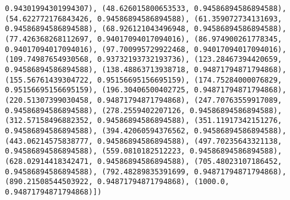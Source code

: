 \documentclass[11pt]{article}
\begin{document}
\begin{Verbatim}[commandchars=\\\{\}]
0.94301994301994307), (48.626015800653533, 0.94586894586894588), (54.622772176843426, 0.94586894586894588), (61.359072734131693, 0.94586894586894588), (68.926121043496948, 0.94586894586894588), (77.426368268112697, 0.94017094017094016), (86.974900261778345, 0.94017094017094016), (97.700995729922468, 0.94017094017094016), (109.74987654930568, 0.93732193732193736), (123.28467394420659, 0.94586894586894588), (138.48863713938718, 0.94871794871794868), (155.56761439304722, 0.95156695156695159), (174.75284000076829, 0.95156695156695159), (196.30406500402725, 0.94871794871794868), (220.51307399030458, 0.94871794871794868), (247.70763559917089, 0.94586894586894588), (278.2559402207126, 0.94586894586894588), (312.57158496882352, 0.94586894586894588), (351.11917342151276, 0.94586894586894588), (394.42060594376562, 0.94586894586894588), (443.06214575838777, 0.94586894586894588), (497.70235643321138, 0.94586894586894588), (559.0810182512223, 0.94586894586894588), (628.02914418342471, 0.94586894586894588), (705.48023107186452, 0.94586894586894588), (792.48289835391699, 0.94871794871794868), (890.21508544503922, 0.94871794871794868), (1000.0, 0.94871794871794868)])

\end{Verbatim}
\end{document}
